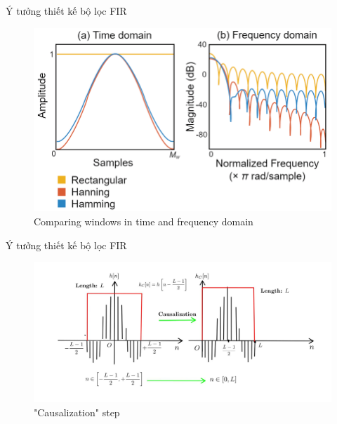\documentclass[8pt]{beamer}
\begin{document}
\begin{frame}{Ý tưởng thiết kế bộ lọc FIR}
	\begin{figure}[h]
		\includegraphics[width=1\textwidth]{The-rectangular-Hanning-and-Hamming-windows-in-the-time-and-frequency-domains-with-Mw.png}
		\caption{Comparing windows in time and frequency domain}			\label{fig:re5}
	\end{figure}
\end{frame}
\begin{frame}{Ý tưởng thiết kế bộ lọc FIR}
	\begin{figure}[h]
		\includegraphics[width=1.1\textwidth]{5.jpg}
		\caption{"Causalization" step}			\label{fig:re6}
	\end{figure}
\end{frame}
\end{document}
